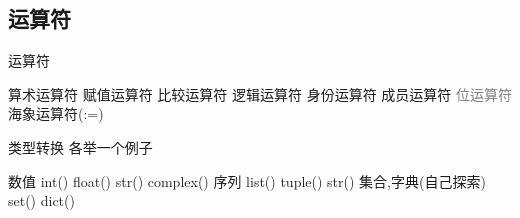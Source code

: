 \subsection{运算符}

\begin{frame}{运算符}
    \begin{myoutline}
        \1 算术运算符
        \1 赋值运算符
        \1 比较运算符
        \1 逻辑运算符
        \1 身份运算符
        \1 成员运算符
        \1 \textcolor{gray}{位运算符}
        \1 海象运算符(:=)
    \end{myoutline}

\end{frame}

\begin{frame}{类型转换}
    各举一个例子
    \begin{myoutline}
        \1 数值
            \2 int()
            \2 float()
            \2 str()
            \2 complex()
        \1 序列
            \2 list()
            \2 tuple()
            \2 str()
        \1 集合,字典(自己探索)
            \2 set()
            \2 dict()
    \end{myoutline}

\end{frame}